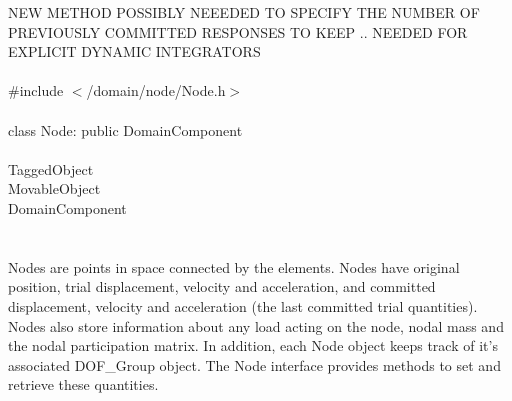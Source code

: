 
NEW METHOD POSSIBLY NEEEDED TO SPECIFY THE NUMBER OF PREVIOUSLY
COMMITTED RESPONSES TO KEEP .. NEEDED FOR EXPLICIT DYNAMIC INTEGRATORS\\

   \\
\indent \#include $<$/domain/node/Node.h$>$  \\

  \\
\indent class Node: public DomainComponent  \\

 \\
\indent TaggedObject \\
\indent MovableObject \\
\indent\indent DomainComponent \\
\indent\indent{} \\

  \\
\indent Nodes are points in space connected by the elements. Nodes
have original position, trial displacement, velocity and acceleration, 
and committed displacement, velocity and acceleration (the last
committed trial quantities). Nodes also store information about any
load acting on the node, nodal mass and the nodal participation
matrix. In addition, each Node object keeps track of it's associated
DOF\_Group object. The Node interface provides methods to set and
retrieve these quantities.\\  


